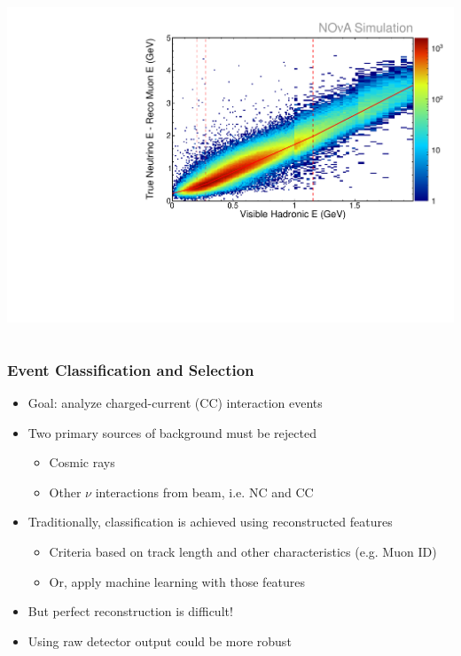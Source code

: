 \documentclass[10pt,professionalfonts,xcolor=table]{beamer}
\begin{document}
\begin{frame}
\begin{columns}[c]
\includegraphics[height=\textwidth, angle=-90]{figures/plots/reco/numu_energy_had_fit.pdf}

\end{columns}


\end{frame}

\begin{frame}
\frametitle{Event Classification and Selection}

\begin{itemize}
\item Goal: analyze \numu charged-current (CC) interaction events
\gap
\item Two primary sources of background must be rejected
  \begin{itemize}
  \item Cosmic rays
  \item Other $\nu$ interactions from beam, i.e. NC and \nue CC
  \end{itemize}
\gap
\item Traditionally, classification is achieved using reconstructed features
  \begin{itemize}
  \item Criteria based on track length and other characteristics (e.g. Muon ID)
  \item Or, apply machine learning with those features
  \end{itemize}
\gap
\item But perfect reconstruction is difficult!
\gap
\item Using raw detector output could be more robust
\end{itemize}
\end{frame}
\end{document}
